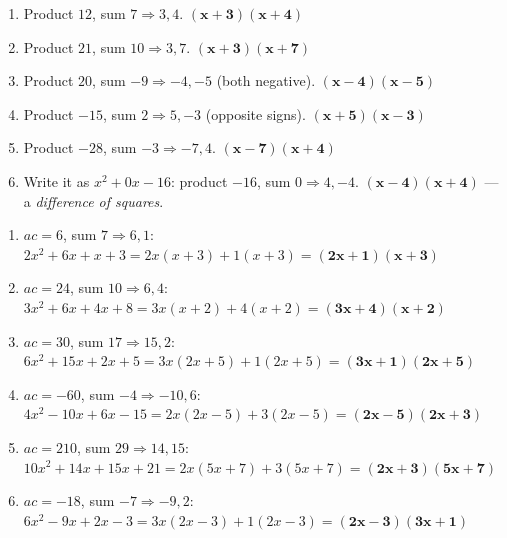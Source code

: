 \documentclass[11pt]{article}
\begin{document}
\begin{anskey}[title={Part 2 --- Factoring, Leading Coefficient $=1$}]
\begin{enumerate}[label=\textbf{\arabic*.},leftmargin=2em,itemsep=4pt]
\item Product $12$, sum $7 \Rightarrow 3,4$. \quad $\mathbf{(x+3)(x+4)}$
\item Product $21$, sum $10 \Rightarrow 3,7$. \quad $\mathbf{(x+3)(x+7)}$
\item Product $20$, sum $-9 \Rightarrow -4,-5$ (both negative). \quad $\mathbf{(x-4)(x-5)}$
\item Product $-15$, sum $2 \Rightarrow 5,-3$ (opposite signs). \quad $\mathbf{(x+5)(x-3)}$
\item Product $-28$, sum $-3 \Rightarrow -7,4$. \quad $\mathbf{(x-7)(x+4)}$
\item Write it as $x^2 + 0x - 16$: product $-16$, sum $0 \Rightarrow 4,-4$. \quad $\mathbf{(x-4)(x+4)}$
--- a \emph{difference of squares}.
\end{enumerate}
\end{anskey}

\begin{anskey}[title={Part 3 --- Factoring, Leading Coefficient $\neq 1$}]
\begin{enumerate}[label=\textbf{\arabic*.},leftmargin=2em,itemsep=5pt]
\item $ac = 6$, sum $7 \Rightarrow 6,1$: \ $2x^2+6x+x+3 = 2x(x+3)+1(x+3) = \mathbf{(2x+1)(x+3)}$
\item $ac = 24$, sum $10 \Rightarrow 6,4$: \ $3x^2+6x+4x+8 = 3x(x+2)+4(x+2) = \mathbf{(3x+4)(x+2)}$
\item $ac = 30$, sum $17 \Rightarrow 15,2$: \ $6x^2+15x+2x+5 = 3x(2x+5)+1(2x+5) = \mathbf{(3x+1)(2x+5)}$
\item $ac = -60$, sum $-4 \Rightarrow -10,6$: \ $4x^2-10x+6x-15 = 2x(2x-5)+3(2x-5) = \mathbf{(2x-5)(2x+3)}$
\item $ac = 210$, sum $29 \Rightarrow 14,15$: \ $10x^2+14x+15x+21 = 2x(5x+7)+3(5x+7) = \mathbf{(2x+3)(5x+7)}$
\item $ac = -18$, sum $-7 \Rightarrow -9,2$: \ $6x^2-9x+2x-3 = 3x(2x-3)+1(2x-3) = \mathbf{(2x-3)(3x+1)}$
\end{enumerate}
\end{anskey}
\end{document}
